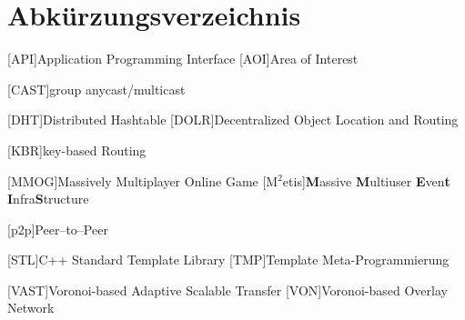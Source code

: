 \chapter*{Abkürzungsverzeichnis}

\pagestyle{useheadings}

\vspace{\topskip}


\begin{acronym}[xxxxxxxxxxxx]
	\setlength{\itemsep}{-\parsep}
	\setlength{\itemindent}{1.5em}
	[API]{Application Programming Interface}
	[AOI]{Area of Interest}

	\vspace{\parsep} 
 [CAST]{group anycast/multicast}

	\vspace{\parsep}
	 [DHT]{Distributed Hashtable}
	[DOLR]{Decentralized Object Location and Routing}



	
	
\vspace{\parsep}
[KBR]{key-based Routing}




	\vspace{\parsep}
	[MMOG]{Massively Multiplayer Online Game}
	[M$^2$etis]{\textbf{M}assive \textbf{M}ultiuser \textbf{E}ven\textbf{t} \textbf{I}nfra\textbf{S}tructure}

	
	\vspace{\parsep}
	[p2p]{Peer--to--Peer}

	

	
	\vspace{\parsep}
	[STL]{C++ Standard Template Library}
	\vspace{\parsep}
	[TMP]{Template Meta-Programmierung}

	\vspace{\parsep}
	[VAST]{Voronoi-based Adaptive Scalable Transfer}
	[VON]{Voronoi-based Overlay Network}





\end{acronym}
